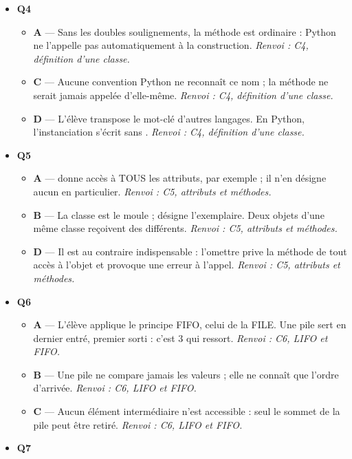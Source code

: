 \begin{itemize}
\begin{itemize}
  \end{itemize}
  \item \textbf{Q4}
  \begin{itemize}
    \item \textbf{A} — Sans les doubles soulignements, la méthode est ordinaire : Python ne l'appelle pas automatiquement à la construction. \emph{Renvoi : C4, définition d'une classe.}
    \item \textbf{C} — Aucune convention Python ne reconnaît ce nom ; la méthode ne serait jamais appelée d'elle-même. \emph{Renvoi : C4, définition d'une classe.}
    \item \textbf{D} — L'élève transpose le mot-clé d'autres langages. En Python, l'instanciation s'écrit sans . \emph{Renvoi : C4, définition d'une classe.}
  \end{itemize}
  \item \textbf{Q5}
  \begin{itemize}
    \item \textbf{A} —  donne accès à TOUS les attributs, par exemple  ; il n'en désigne aucun en particulier. \emph{Renvoi : C5, attributs et méthodes.}
    \item \textbf{B} — La classe est le moule ;  désigne l'exemplaire. Deux objets d'une même classe reçoivent des  différents. \emph{Renvoi : C5, attributs et méthodes.}
    \item \textbf{D} — Il est au contraire indispensable : l'omettre prive la méthode de tout accès à l'objet et provoque une erreur à l'appel. \emph{Renvoi : C5, attributs et méthodes.}
  \end{itemize}
  \item \textbf{Q6}
  \begin{itemize}
    \item \textbf{A} — L'élève applique le principe FIFO, celui de la FILE. Une pile sert en dernier entré, premier sorti : c'est $3$ qui ressort. \emph{Renvoi : C6, LIFO et FIFO.}
    \item \textbf{B} — Une pile ne compare jamais les valeurs ; elle ne connaît que l'ordre d'arrivée. \emph{Renvoi : C6, LIFO et FIFO.}
    \item \textbf{C} — Aucun élément intermédiaire n'est accessible : seul le sommet de la pile peut être retiré. \emph{Renvoi : C6, LIFO et FIFO.}
  \end{itemize}
  \item \textbf{Q7}
  \begin{itemize}

\end{itemize}
\end{itemize}
